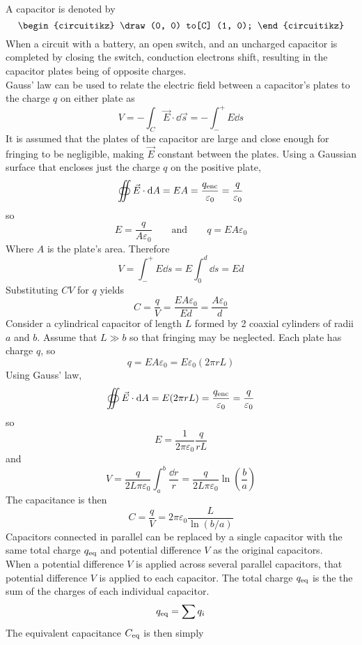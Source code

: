 \documentclass[./Electricity and Magnetism.tex]{subfiles}
\begin{document}
			A capacitor is denoted by
			\[\begin{circuitikz}
				\draw (0, 0) to[C] (1, 0);
			\end{circuitikz}\]
		When a circuit with a battery, an open switch, and an uncharged capacitor is completed by closing the switch, conduction electrons shift, resulting in the capacitor plates being of opposite charges. \\
		Gauss' law can be used to relate the electric field between a capacitor's plates to the charge \(q\) on either plate as
			\[
				V = -\int_C \vec{E} \cdot \dd{\vec{s}}
					= -\int_-^+ E \dd{s}
			\]
			It is assumed that the plates of the capacitor are large and close enough for fringing to be negligible, making \(\vec{E}\) constant between the plates. Using a Gaussian surface that encloses just the charge \(q\) on the positive plate,
			\[
				\oiint \vec{E} \cdot \dd{A} = EA
					= \frac{q_{\text{enc}}}{\varepsilon_0} = \frac{q}{\varepsilon_0} 
			\]
			so
			\[
				E = \frac{q}{A\varepsilon_0} \qquad \text{and} \qquad
				q = EA\varepsilon_0
			\]
			Where \(A\) is the plate's area. Therefore
			\[
				V = \int_-^+ E\dd{s}
					= E\int_0^d \dd{s}
					= Ed
			\]
			Substituting \(CV\) for \(q\) yields 
			\[
				C = \frac{q}{V} 
					= \frac{EA\varepsilon_0}{Ed}
					= \frac{A\varepsilon_0}{d}
					\tag{parallel-plate capacitor}
			\]
		Consider a cylindrical capacitor of length \(L\) formed by 2 coaxial cylinders of radii \(a\) and \(b\). Assume that \(L \gg b\) so that fringing may be neglected. Each plate has charge \(q\), so			
			\[
				q = EA\varepsilon_0 = 
					E\varepsilon_0(2\pi rL)
			\]
			Using Gauss' law,
			\[
				\oiint \vec{E} \cdot \dd{A} 
					= E(2\pi rL)
					= \frac{q_{\text{enc}}}{\varepsilon_0}
					= \frac{q}{\varepsilon_0}
			\]
			so
			\[E = \frac{1}{2\pi\varepsilon_0}\frac{q}{rL}\]
			and
			\[
				V = \frac{q}{2L\pi\varepsilon_0}\int_a^b\frac{\dd{r}}{r}
					= \frac{q}{2L\pi\varepsilon_0}\ln(\frac{b}{a})
			\]
			The capacitance is then
			\[
				C = \frac{q}{V}
					= 2\pi\varepsilon_0\frac{L}{\ln(b/a)}
			\]
		Capacitors connected in parallel can be replaced by a single capacitor with the same total charge \(q_{\text{eq}}\) and potential difference \(V\) as the original capacitors. \\
			When a potential difference \(V\) is applied across several parallel capacitors, that potential difference \(V\) is applied to each capacitor. The total charge \(q_{\text{eq}}\) is the the sum of the charges of each individual capacitor.
			\[q_{\text{eq}} = \sum q_i\]
			The equivalent capacitance \(C_{\text{eq}}\) is then simply
\end{document}
